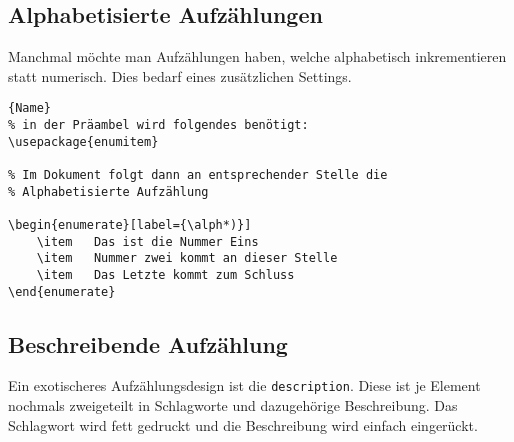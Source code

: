 
\subsection{Alphabetisierte Aufzählungen}

\indent
Manchmal möchte man Aufzählungen haben, welche alphabetisch
inkrementieren statt numerisch. Dies bedarf eines
zusätzlichen Settings.

\begin{lstlisting}[caption=Alphabetisierte Aufzählung,
                   label={lst:simplelist}]{Name}
% in der Präambel wird folgendes benötigt:
\usepackage{enumitem}

% Im Dokument folgt dann an entsprechender Stelle die
% Alphabetisierte Aufzählung

\begin{enumerate}[label={\alph*)}]
    \item   Das ist die Nummer Eins
    \item   Nummer zwei kommt an dieser Stelle
    \item   Das Letzte kommt zum Schluss
\end{enumerate}

\end{lstlisting}


\subsection{Beschreibende Aufzählung}

\noindent 
Ein exotischeres Aufzählungsdesign ist die
\lstinline|description|. Diese ist je Element nochmals
zweigeteilt in Schlagworte und dazugehörige Beschreibung.
Das Schlagwort wird fett gedruckt und die Beschreibung wird
einfach eingerückt.

